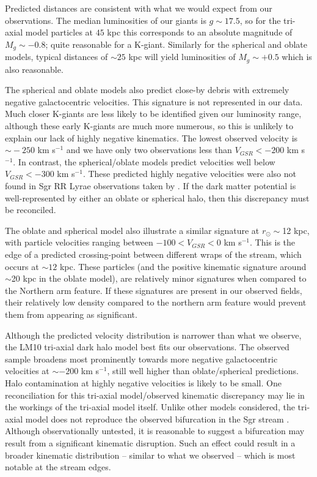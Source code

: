 \documentclass[preprint2]{aastex}
\begin{document}
	Predicted distances are consistent with what we would expect from our observations. The median luminosities of our giants is $g\sim17.5$, so for the tri-axial model particles at $45$ kpc this corresponds to an absolute magnitude of $M_g\sim-0.8$; quite reasonable for a K-giant. Similarly for the spherical and oblate models, typical distances of $\sim25$ kpc will yield luminosities of $M_g\sim+0.5$ which is also reasonable.  
	
	The spherical and oblate models also predict close-by debris with extremely negative galactocentric velocities. This signature is not represented in our data. Much closer K-giants are less likely to be identified given our luminosity range, although these early K-giants are much more numerous, so this is unlikely to explain our lack of highly negative kinematics.  The lowest observed velocity is $\sim{}-250$ km s$^{-1}$ and we have only two observations less than $V_{GSR} < -200$ km s$^{-1}$. In contrast, the spherical/oblate models predict velocities well below $V_{GSR} < -300$ km s$^{-1}$. These predicted highly negative  velocities were also not found in Sgr RR Lyrae observations taken by \citet{Prior;et-al_2009b}. If the dark matter potential is well-represented by either an oblate or spherical halo, then this discrepancy must be reconciled. 
	
	The oblate and spherical model also illustrate a similar signature at $r_\odot \sim$12 kpc, with particle velocities ranging between $-100 < V_{GSR} < 0$ km s$^{-1}$. This is the edge of a predicted crossing-point between different wraps of the stream, which occurs at $\sim12$ kpc. These particles (and the positive kinematic signature around $\sim$20 kpc in the oblate model), are relatively minor signatures when compared to the Northern arm feature. If these signatures are present in our observed fields, their relatively low density compared to the northern arm feature would prevent them from appearing as significant. 
	
	Although the predicted velocity distribution is narrower than what we observe, the LM10 tri-axial dark halo model best fits our observations. The observed sample broadens most prominently towards more negative galactocentric velocities at $\sim-200$ km s$^{-1}$, still well higher than oblate/spherical predictions. Halo contamination at highly negative velocities is likely to be small. One reconciliation for this tri-axial model/observed kinematic discrepancy may lie in the workings of the tri-axial model itself. Unlike other models considered, the tri-axial model does not reproduce the observed bifurcation in the Sgr stream \citep{Belokurov;et-al_2006}. Although observationally untested, it is reasonable to suggest a bifurcation may result from a significant kinematic disruption. Such an effect could result in a broader kinematic distribution \--- similar to what we observed \--- which is most notable at the stream edges.
	
\end{document}
